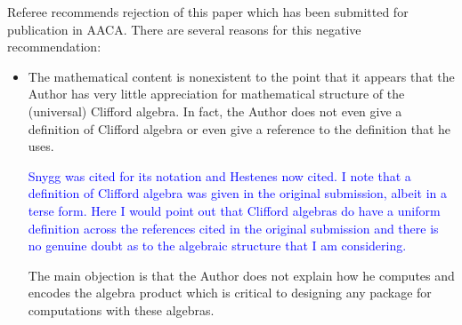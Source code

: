 \documentclass{article}
\begin{document}
Referee recommends rejection of this paper which has been submitted for publication in AACA.
There are several reasons for this negative recommendation:
\begin{itemize}
  \item The mathematical content is nonexistent to the point that it
    appears that the Author has very little appreciation for
    mathematical structure of the (universal) Clifford algebra. In
    fact, the Author does not even give a definition of Clifford
    algebra or even give a reference to the definition that he uses.

\textcolor{blue}{Snygg was cited for its notation and Hestenes now
  cited.  I note that a definition of Clifford algebra was given in
  the original submission, albeit in a terse form.  Here I would point
  out that Clifford algebras do have a uniform definition across the
  references cited in the original submission and there is no genuine
  doubt as to the algebraic structure that I am considering.}

    The main objection is that the Author does not explain how he
    computes and encodes the algebra product which is critical to
    designing any package for computations with these algebras.


\end{itemize}
\end{document}

